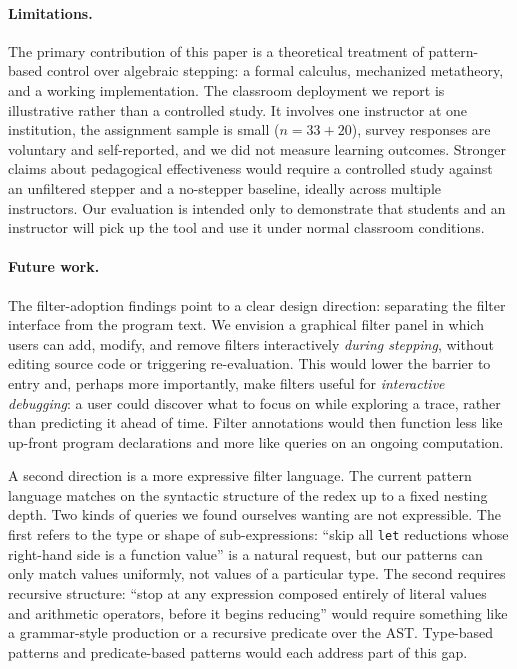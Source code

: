 \paragraph*{Limitations.}
The primary contribution of this paper is a theoretical treatment of
pattern-based control over algebraic stepping: a formal calculus,
mechanized metatheory, and a working implementation. The classroom
deployment we report is illustrative rather than a controlled study.
It involves one instructor at one institution, the assignment sample
is small ($n = 33 + 20$), survey responses are voluntary and
self-reported, and we did not measure learning outcomes. Stronger
claims about pedagogical effectiveness would require a controlled
study against an unfiltered stepper and a no-stepper baseline,
ideally across multiple instructors. Our evaluation is intended
only to demonstrate that students and an instructor will pick up the
tool and use it under normal classroom conditions.

\paragraph*{Future work.}

The filter-adoption findings point to a clear design direction:
separating the filter interface from the program text. We envision a
graphical filter panel in which users can add, modify, and remove
filters interactively \emph{during stepping}, without editing source
code or triggering re-evaluation. This would lower the barrier to
entry and, perhaps more importantly, make filters useful for
\emph{interactive debugging}: a user could discover what to focus on
while exploring a trace, rather than predicting it ahead of time.
Filter annotations would then function less like up-front program
declarations and more like queries on an ongoing computation.

A second direction is a more expressive filter language. The current
pattern language matches on the syntactic structure of the redex up
to a fixed nesting depth. Two kinds of queries we found ourselves
wanting are not expressible. The first refers to the type or shape
of sub-expressions: ``skip all \texttt{let} reductions whose
right-hand side is a function value'' is a natural request, but our
patterns can only match values uniformly, not values of a particular
type. The second requires recursive structure: ``stop at any
expression composed entirely of literal values and arithmetic
operators, before it begins reducing'' would require something like
a grammar-style production or a recursive predicate over the AST.
Type-based patterns and predicate-based patterns would each
address part of this gap.

